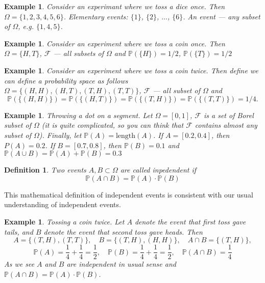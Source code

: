 \documentclass[12pt]{article}
\newtheorem{definition}[theorem]{Definition}
\newtheorem{example}[theorem]{Example}
\begin{document}
\begin{example} Consider an experimant where we toss a dice once. 
    Then $\Omega=\{1,2,3,4,5,6\}$. 
    Elementary events: $\{1\}$, $\{2\}$, $\ldots$, $\{6\}$. 
    An event --- any subset of $\Omega$, e.g. $\{1,4,5\}$.
\end{example}

\begin{example} Consider an experiment where we toss a coin once. 
    Then $\Omega=\{H, T\}$, $\mathcal{F}$ ---
    all subsets of $\Omega$ and $\mathbb{P}(\{H \})=1/2$, 
    $\mathbb{P}(\{T \})=1/2$
\end{example}

\begin{example} Consider an experiment where we toss a coin twice. 
    Then define we can define a probability space as follows
    $\Omega=\{(H,H), (H, T), (T, H), (T,T)\}$, 
    $\mathcal{F}$ --- all subset of $\Omega$
    and
    $$
        \mathbb{P}(\{(H,H) \})=\mathbb{P}(\{(H,T) \})
        =\mathbb{P}(\{(T,H) \})
        =\mathbb{P}(\{(T,T) \})=1/4.
    $$
\end{example}

\begin{example} Throwing a dot on a segment. Let $\Omega=[0,1]$, $\mathcal{F}$ 
    is a set of Borel subset of $\Omega$ (it is quite complicated, so you can 
    think that $\mathcal{F}$ contains almost any subset of $\Omega$). Finally, 
    let $\mathbb{P}(A)=\mbox{length}(A)$. If $A=[0.2, 0.4]$, then $P(A)=0.2$. If
    $B=[0.7,0.8]$, then $\mathbb{P}(B)=0.1$ and 
    $\mathbb{P}(A\cup B)=\mathbb{P}(A)+\mathbb{P}(B)=0.3$
\end{example}

\begin{definition} Two events $A,B\subset \Omega$ are called inpedendent if
    $$
        \mathbb{P}(A\cap B)=\mathbb{P}(A)\cdot\mathbb{P}(B)
    $$
\end{definition}

This mathematical definition of independent events is consistent with our usual
understanding of independent events.

\begin{example} Tossing a coin twice. Let $A$ denote the event that first toss 
    gave tails, and $B$ denote the event that second toss gave heads. Then
    $$
        A=\{(T,H),(T,T)\},\quad B=\{(T,H),(H,H)\},\quad A\cap B=\{(T,H)\},
    $$
    $$
        \mathbb{P}(A)=\frac{1}{4}+\frac{1}{4}=\frac{1}{2},\quad
        \mathbb{P}(B)=\frac{1}{4}+\frac{1}{4}=\frac{1}{2},\quad
        \mathbb{P}(A\cap B)=\frac{1}{4}
    $$
    As we see $A$ and $B$ are independent in usual sense and $\mathbb{P}(A\cap
        B)=\mathbb{P}(A)\cdot\mathbb{P}(B)$.
\end{example}
\end{document}
